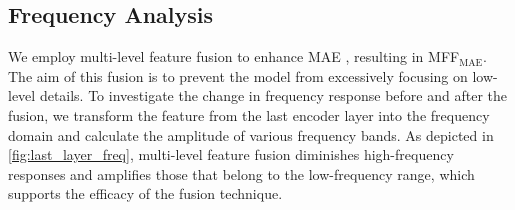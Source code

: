 \subsection{Frequency Analysis}
\label{sec:freq_ana}
We employ multi-level feature fusion to enhance MAE \cite{MAE}, resulting in MFF$_\text{MAE}$. The aim of this fusion is to prevent the model from excessively focusing on low-level details. To investigate the change in frequency response before and after the fusion, we transform the feature from the last encoder layer into the frequency domain and calculate the amplitude of various frequency bands. As depicted in \autoref{fig:last_layer_freq}, multi-level feature fusion diminishes high-frequency responses and amplifies those that belong to the low-frequency range, which supports the efficacy of the fusion technique.

% 
